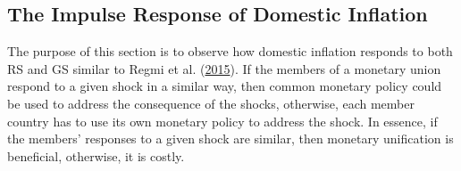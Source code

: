 \documentclass[]{article}
\begin{document}
\begin{table}[t]

\caption{\label{tab:tabDef}Sample, Model and Definition of Global Variable}
\centering
{}
\end{table}

\FloatBarrier

\hypertarget{the-impulse-response-of-domestic-inflation}{%
\subsection{The Impulse Response of Domestic Inflation}\label{the-impulse-response-of-domestic-inflation}}

The purpose of this section is to observe how domestic inflation responds to both RS and GS similar to Regmi et al. (\protect\hyperlink{ref-Regmi2015}{2015}). If the members of a monetary union respond to a given shock in a similar way, then common monetary policy could be used to address the consequence of the shocks, otherwise, each member country has to use its own monetary policy to address the shock. In essence, if the members' responses to a given shock are similar, then monetary unification is beneficial, otherwise, it is costly.
\end{document}
